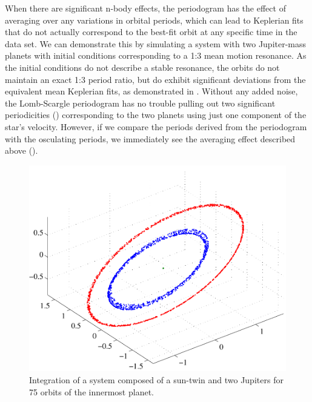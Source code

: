 When there are significant n-body effects, the periodogram has the effect of averaging over any variations in orbital periods, which can lead to Keplerian fits that do not actually correspond to the best-fit orbit at any specific time in the data set.  We can demonstrate this by simulating a system with two Jupiter-mass planets with initial conditions corresponding to a 1:3 mean motion resonance.  As the initial conditions do not describe a stable resonance, the orbits do not maintain an exact 1:3 period ratio, but do exhibit significant deviations from the equivalent mean Keplerian fits, as demonstrated in .  Without any added noise, the Lomb-Scargle periodogram has no trouble pulling out two significant periodicities () corresponding to the two planets using just one component of the star's velocity.  However, if we compare the periods derived from the periodogram with the osculating periods, we immediately see the averaging effect described above ().
\begin{figure}[ht]
\centering
\includegraphics[width=5.5in]{./figures/twoJupSystem}
 \caption[Two Jupiter system]{Integration of a system composed of a sun-twin and two Jupiters for 75 orbits of the innermost planet. \label{fig:twoJupSystem}}
\end{figure} 
